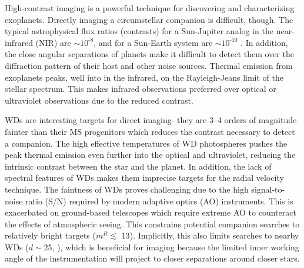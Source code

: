 \documentclass[twocolumn]{aastex631}
\begin{document}
High-contrast imaging is a powerful technique for discovering and characterizing exoplanets. Directly imaging a circumstellar companion is difficult, though. The typical astrophysical flux ratios (contrasts) for a Sun-Jupiter analog in the near-infrared (NIR) are $\sim$$10^{\text{-}8}$, and for a Sun-Earth system are $\sim$$10^{\text{-}10}$ \citep{traubDirectImagingExoplanets2010}. In addition, the close angular separations of planets make it difficult to detect them over the diffraction pattern of their host and other noise sources. Thermal emission from exoplanets peaks, well into in the infrared, on the Rayleigh-Jeans limit of the stellar spectrum. This makes infrared observations preferred over optical or ultraviolet observations due to the reduced contrast.

WDs are interesting targets for direct imaging- they are \numrange{3}{4} orders of magnitude fainter than their MS progenitors which reduces the contrast necessary to detect a companion. The high effective temperatures of WD photospheres pushes the peak thermal emission even further into the optical and ultraviolet, reducing the intrinsic contrast between the star and the planet. In addition, the lack of spectral features of WDs \citep{schatzmanTheorieDebitEnergie1945} makes them imprecise targets for the radial velocity technique. The faintness of WDs proves challenging due to the high signal-to-noise ratio (S/N) required by modern adaptive optics (AO) instruments. This is exacerbated on ground-based telescopes which require extreme AO to counteract the effects of atmospheric seeing. This constrains potential companion searches to relatively bright targets ($m^R\lesssim$ 13). Implicitly, this also limits searches to nearby WDs ($d\sim$\qty{25}{\parsec}, \citealp{holberg25ParsecLocal2016}), which is beneficial for imaging because the limited inner working angle of the instrumentation will project to closer separations around closer stars.





\end{document}
